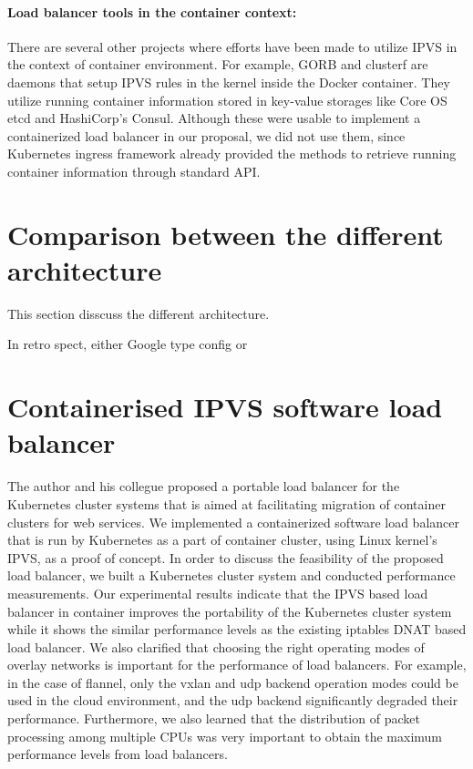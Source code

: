 \paragraph{\bf Load balancer tools in the container context:}
There are several other projects where efforts have been made to utilize IPVS in the context of container environment.
For example, GORB\cite{Sibiryov2015} and clusterf\cite{Aaltodoc:http://urn.fi/URN:NBN:fi:aalto-201611025433} are daemons 
that setup IPVS rules in the kernel inside the Docker container. 
They utilize running container information stored in key-value storages
like Core OS etcd\cite{CoreOSEtcd} and HashiCorp's Consul\cite{HashiCorpConsul}. 
Although these were usable to implement a containerized load balancer in our proposal, we did not use them, 
since Kubernetes ingress framework already provided the methods to retrieve running container information through standard API.


\section{Comparison between the different architecture}\label{Traffice engineering}

This section disscuss the different architecture.

In retro spect,  either Google type config or 

\section{Containerised IPVS software load balancer}\label{IPVS software LB}


The author and his collegue proposed a portable load balancer for the Kubernetes cluster systems 
that is aimed at facilitating migration of container clusters for web services.
We implemented a containerized software load balancer that is run by Kubernetes as a part of container cluster, 
using Linux kernel's IPVS, as a proof of concept.
In order to discuss the feasibility of the proposed load balancer, we built 
a Kubernetes cluster system and conducted performance measurements.
Our experimental results indicate that the IPVS based load balancer in container improves the portability of 
the Kubernetes cluster system while it shows the similar performance levels as the existing iptables DNAT based load balancer.
We also clarified that choosing the right operating modes of overlay networks is important for the performance of load balancers. 
For example, in the case of flannel, only the vxlan and udp backend operation modes could be used 
in the cloud environment, and the udp backend significantly degraded their performance.
Furthermore, we also learned that the distribution of packet processing among multiple CPUs was very important
to obtain the maximum performance levels from load balancers.
%

